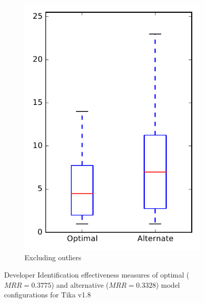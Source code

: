 \begin{figure}
\begin{subfigure}{.4\textwidth}
        \includegraphics[height=0.4\textheight]{figures/combo/dit_rq1_tika_no_outlier}
        \caption{Excluding outliers}\label{fig:combo:dit:rq1:tika_no_outlier}
    \end{subfigure}
\caption[Developer Identification effectiveness measures of optimal and alternative model configurations for Tika v1.8]%
{Developer Identification effectiveness measures of optimal ($MRR=0.3775$) and alternative ($MRR=0.3328$) model configurations for Tika v1.8}
\label{fig:combo:dit:rq1:tika}
\end{figure}

